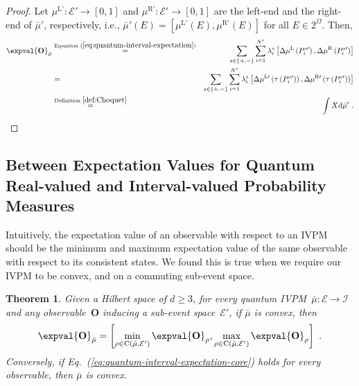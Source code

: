 \documentclass[12pt]{iopart}
\theoremstyle{plain}
\newtheorem{thm}{Theorem}
\theoremstyle{definition}
\theoremstyle{remark}
\newcommand{\events}{\ensuremath{\mathcal{E}}}
\newcommand{\coreBorn}{\ensuremath{\mathrm{C}}}
\newcommand{\mul}[1][]{\ensuremath{\mu^{\mathrm{L{#1}}}}}
\newcommand{\mur}[1][]{\ensuremath{\mu^{\mathrm{R{#1}}}}}
\begin{document}
\begin{proof}Let $\mul[\prime]:\events'\rightarrow\left[0,1\right]$
and $\mur[\prime]:\events'\rightarrow\left[0,1\right]$ are the left-end
and the right-end of $\bar{\mu}'$, respectively, i.e., $\bar{\mu}'\left(E\right)=\left[\mul[\prime]\left(E\right),\mur[\prime]\left(E\right)\right]$
for all $E\in2^{\Omega}$. Then, 
\begin{eqnarray*}
\expval{\mathbf{O}}_{\bar{\mu}} & \stackrel{\textrm{Equation }(\ref{eq:quantum-interval-expectation})}{=} & \sum_{s\in\left\{ +,-\right\} }\sum_{i=1}^{N^{s}}\lambda_{i}^{s}\left[\Delta\mul\left(P_{i}^{s\prime}\right),\Delta\mur\left(P_{i}^{s\prime}\right)\right]\\
 & = & \sum_{s\in\left\{ +,-\right\} }\sum_{i=1}^{N^{s}}\lambda_{i}^{s}\left[\Delta\mul[\prime]\left(\tau\left(P_{i}^{s\prime}\right)\right),\Delta\mur[\prime]\left(\tau\left(P_{i}^{s\prime}\right)\right)\right]\\
 & \stackrel{\textrm{Definition }\ref{def:Choquet}}{=} & \int X\rmd\bar{\mu}'\textrm{ .}
\end{eqnarray*}
\end{proof}

\subsection{Between Expectation Values for Quantum Real-valued and Interval-valued
Probability Measures}

Intuitively, the expectation value of an observable with respect to
an IVPM should be the minimum and maximum expectation value of the
same observable with respect to its consistent states. We found this
is true when we require our IVPM to be convex, and on a commuting
sub-event space.

\begin{thm}Given a Hilbert space of $d\ge3$, for every quantum IVPM~$\bar{\mu}:\events\rightarrow\mathscr{I}$
and any observable~$\mathbf{O}$ inducing a sub-event space~$\events'$,
if $\bar{\mu}$ is convex, then
\begin{equation}
\expval{\mathbf{O}}_{\bar{\mu}}=\left[\min_{\rho\in\coreBorn\left(\bar{\mu},\events'\right)}\expval{\mathbf{O}}_{\rho},\max_{\rho\in\coreBorn\left(\bar{\mu},\events'\right)}\expval{\mathbf{O}}_{\rho}\right]\textrm{ .}\label{eq:quantum-interval-expectation-core}
\end{equation}
Conversely, if Eq.~(\ref{eq:quantum-interval-expectation-core})
holds for every observable, then $\bar{\mu}$ is convex.\end{thm}
\end{document}
